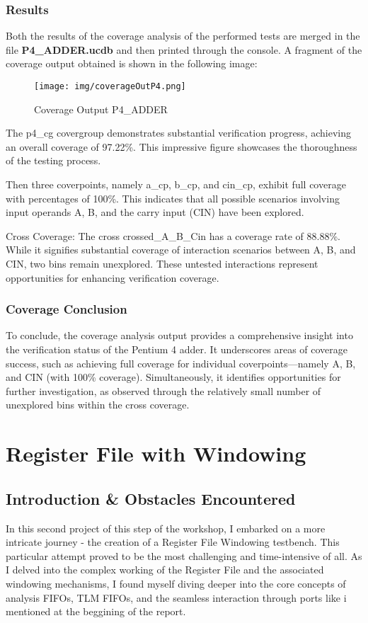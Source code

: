 \documentclass[12pt,a4paper]{report}
\begin{document}
\subsection{Results}
Both the results of the coverage analysis of the performed tests are merged in the file \textbf{P4\_ADDER.ucdb}  and then printed through the console. A fragment of the coverage output obtained is shown in the following image:
 \begin{figure}[H]
\centering
\texttt{[image: img/coverageOutP4.png]}
\label{Coverage Output P4\_ADDER}
\caption{Coverage Output P4\_ADDER}
\end{figure}
\vspace{0.3cm}
The p4\_cg covergroup demonstrates substantial verification progress, achieving an overall coverage of 97.22\%. This impressive figure showcases the thoroughness of the testing process.

Then three coverpoints, namely a\_cp, b\_cp, and cin\_cp, exhibit full coverage with percentages of 100\%. This indicates that all possible scenarios involving input operands A, B, and the carry input (CIN) have been explored.

Cross Coverage: The cross crossed\_A\_B\_Cin has a coverage rate of 88.88\%. While it signifies substantial coverage of interaction scenarios between A, B, and CIN, two bins remain unexplored. These untested interactions represent opportunities for enhancing verification coverage.
\subsection{Coverage Conclusion}
To conclude, the coverage analysis output provides a comprehensive insight into the verification status of the Pentium 4 adder. It underscores areas of coverage success, such as achieving full coverage for individual coverpoints—namely A, B, and CIN (with 100\% coverage). Simultaneously, it identifies opportunities for further investigation, as observed through the relatively small number of unexplored bins within the cross coverage. 

\chapter{Register File with Windowing}
\section{Introduction \& Obstacles Encountered}
In this second project of this step of the workshop, I embarked on a more intricate journey - the creation of a Register File Windowing testbench. This particular attempt proved to be the most challenging and time-intensive of all. As I delved into the complex working of the Register File and the associated windowing mechanisms, I found myself diving deeper into the core concepts of analysis FIFOs, TLM FIFOs, and the seamless interaction through ports like i mentioned at the beggining of the report.
\end{document}
